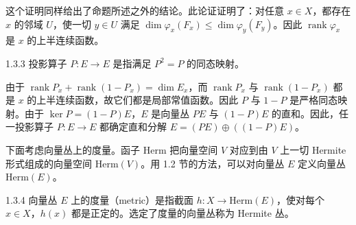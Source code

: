 
这个证明同样给出了命题所述之外的结论。此论证证明了：对任意 $x\in X$，都存在 $x$ 的邻域 $U$，使一切 $y\in U$ 满足 $\dim\varphi_x(F_x)\le\dim\varphi_y(F_y)$。因此 $\operatorname{rank}\varphi_x$ 是 $x$ 的上半连续函数。

\begin{definition}{1.3.3}
  投影算子 $P\colon E\to E$ 是指满足 $P^2=P$ 的同态映射。
\end{definition}


由于 $\operatorname{rank}P_x+\operatorname{rank}(1-P_x)=\dim E_x$，而 $\operatorname{rank}P_x$ 与 $\operatorname{rank}(1-P_x)$ 都是 $x$ 的上半连续函数，故它们都是局部常值函数。因此 $P$ 与 $1-P$ 是严格同态映射。由于 $\ker P=(1-P)E$，$E$ 是向量丛 $PE$ 与 $(1-P)E$ 的直和。因此，任一投影算子 $P\colon E\to E$ 都确定直和分解 $E=(PE)\oplus((1-P)E)$。


下面考虑向量丛上的度量。函子 $\mathrm{Herm}$ 把向量空间 $V$ 对应到由 $V$ 上一切 Hermite 形式组成的向量空间 $\mathrm{Herm}(V)$。用 1.2 节的方法，可以对向量丛 $E$ 定义向量丛 $\mathrm{Herm}(E)$。

\begin{definition}{1.3.4}
  向量丛 $E$ 上的度量（metric）是指截面 $h\colon X\to\mathrm{Herm}(E)$，使对每个 $x\in X$，$h(x)$ 都是正定的。选定了度量的向量丛称为 Hermite 丛。
\end{definition}

